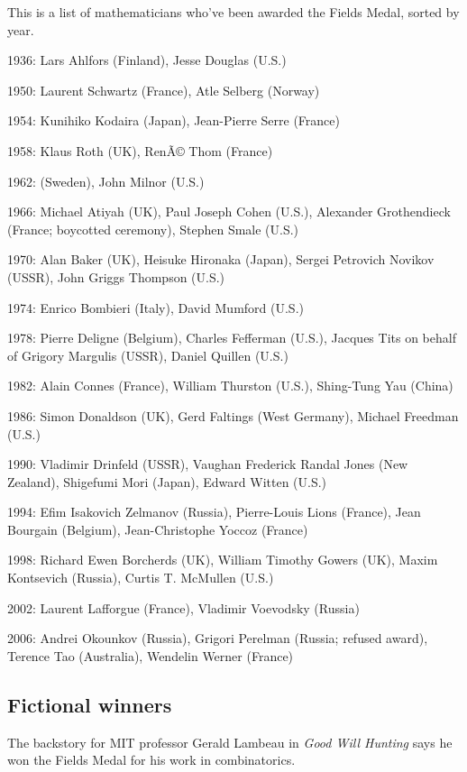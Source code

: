 \documentclass[12pt]{article}
\begin{document}
This is a list of mathematicians who've been awarded the Fields Medal, sorted by year.

1936: Lars Ahlfors (Finland), Jesse Douglas (U.S.) 

1950: Laurent Schwartz (France), Atle Selberg (Norway)

1954: Kunihiko Kodaira (Japan), Jean-Pierre Serre (France)

1958: Klaus Roth (UK), RenÃ© Thom (France) 

1962:  (Sweden), John Milnor (U.S.) 

1966: Michael Atiyah (UK), Paul Joseph Cohen (U.S.), Alexander Grothendieck (France; boycotted ceremony), Stephen Smale (U.S.) 

1970: Alan Baker (UK), Heisuke Hironaka (Japan), Sergei Petrovich Novikov (USSR), John Griggs Thompson (U.S.) 

1974: Enrico Bombieri (Italy), David Mumford (U.S.) 

1978: Pierre Deligne (Belgium), Charles Fefferman (U.S.), Jacques Tits on behalf of Grigory Margulis (USSR), Daniel Quillen (U.S.) 

1982: Alain Connes (France), William Thurston (U.S.), Shing-Tung Yau (China) 

1986: Simon Donaldson (UK), Gerd Faltings (West Germany), Michael Freedman (U.S.) 

1990: Vladimir Drinfeld (USSR), Vaughan Frederick Randal Jones (New Zealand), Shigefumi Mori (Japan), Edward Witten (U.S.) 

1994: Efim Isakovich Zelmanov (Russia), Pierre-Louis Lions (France), Jean Bourgain (Belgium), Jean-Christophe Yoccoz (France) 

1998: Richard Ewen Borcherds (UK), William Timothy Gowers (UK), Maxim Kontsevich (Russia), Curtis T. McMullen (U.S.) 

2002: Laurent Lafforgue (France), Vladimir Voevodsky (Russia) 

2006: Andrei Okounkov (Russia), Grigori Perelman (Russia; refused award), Terence Tao (Australia), Wendelin Werner (France) 

\subsection{Fictional winners}

The backstory for MIT professor Gerald Lambeau in {\it Good Will Hunting} says he won the Fields Medal for his work in combinatorics.
\end{document}
